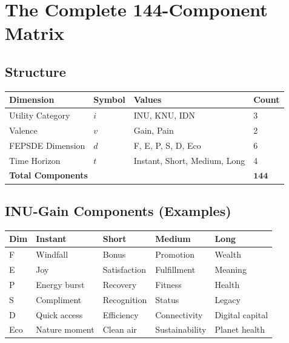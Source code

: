 \documentclass[12pt,a4paper]{article}
\begin{document}
\section{The Complete 144-Component Matrix}
\label{app:matrix}

\subsection{Structure}

\begin{center}
\renewcommand{\arraystretch}{1.3}
\begin{tabular}{llll}
\hline
\textbf{Dimension} & \textbf{Symbol} & \textbf{Values} & \textbf{Count} \\
\hline
Utility Category & $i$ & INU, KNU, IDN & 3 \\
Valence & $v$ & Gain, Pain & 2 \\
FEPSDE Dimension & $d$ & F, E, P, S, D, Eco & 6 \\
Time Horizon & $t$ & Instant, Short, Medium, Long & 4 \\
\hline
\multicolumn{3}{l}{\textbf{Total Components}} & $\mathbf{144}$ \\
\hline
\end{tabular}
\end{center}

\subsection{INU-Gain Components (Examples)}

\begin{center}
\renewcommand{\arraystretch}{1.1}
\begin{tabular}{lllll}
\hline
\textbf{Dim} & \textbf{Instant} & \textbf{Short} & \textbf{Medium} & \textbf{Long} \\
\hline
F & Windfall & Bonus & Promotion & Wealth \\
E & Joy & Satisfaction & Fulfillment & Meaning \\
P & Energy burst & Recovery & Fitness & Health \\
S & Compliment & Recognition & Status & Legacy \\
D & Quick access & Efficiency & Connectivity & Digital capital \\
Eco & Nature moment & Clean air & Sustainability & Planet health \\
\hline
\end{tabular}
\end{center}
\end{document}
